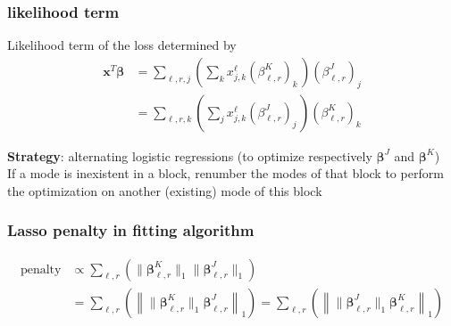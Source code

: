 \documentclass{beamer}
\begin{document}
\begin{frame}
\frametitle{likelihood term}
Likelihood term of the loss determined by
\begin{align}
\mathbf{x}^T\bm{\beta} &=  \sum\limits_{\ell,r,j} \left(\sum\limits_{k}  x_{j,k}^\ell(\beta_{\ell,r}^{K})_k \, \right)(\beta_{\ell,r}^{J})_j\\
&= \sum\limits_{\ell,r,k} \left(\sum\limits_{j}  x_{j,k}^\ell(\beta_{\ell,r}^{J})_j \, \right)(\beta_{\ell,r}^{K})_k
\end{align}

\textbf{Strategy}: alternating logistic regressions (to optimize respectively $\bm{\beta}^J$ and $\bm{\beta}^K$)\\[5 pt]

If a mode is inexistent in a block, renumber the modes of that block to perform the optimization on another (existing) mode of this block

\end{frame}

\begin{frame}
    \frametitle{Lasso penalty in fitting algorithm}

    \begin{align}
        \text{penalty} &\propto \sum\limits_{\ell,r} \left( \lVert \bm{\beta}_{\ell,r}^K \rVert_1 \lVert \bm{\beta}_{\ell,r}^J \rVert_1 \right)\\
        &= \sum\limits_{\ell,r} \left( \left\lVert  \lVert\bm{\beta}_{\ell,r}^K \rVert_1  \bm{\beta}_{\ell,r}^J \right\rVert_1 \right)  = \sum\limits_{\ell,r} \left( \left\lVert  \lVert\bm{\beta}_{\ell,r}^J \rVert_1  \bm{\beta}_{\ell,r}^K \right\rVert_1  \right)
    \end{align}

\end{frame}
\end{document}
